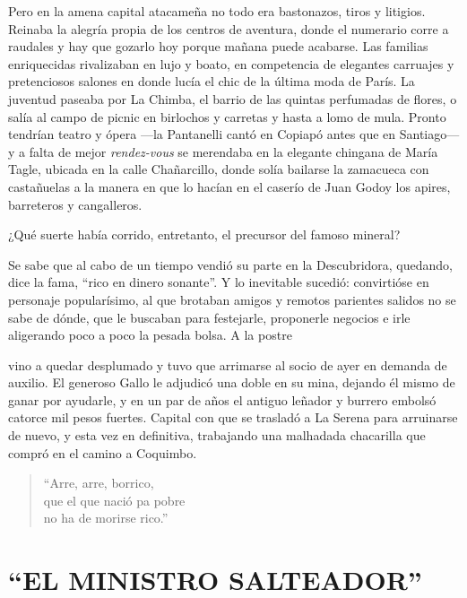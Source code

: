 \documentclass[10pt,twoside,openright]{memoir}
\begin{document}
Pero en la amena capital atacameña no todo era bastonazos, tiros y
litigios. Reinaba la alegría propia de los centros de aventura, donde el
numerario corre a raudales y hay que gozarlo hoy porque mañana puede
acabarse. Las familias enriquecidas rivalizaban en lujo y boato, en
competencia de elegantes carruajes y pretenciosos salones en donde lucía
el chic de la última moda de París. La juventud paseaba por La Chimba,
el barrio de las quintas perfumadas de flores, o salía al campo de
picnic en birlochos y carretas y hasta a lomo de mula. Pronto tendrían
teatro y ópera ---la Pantanelli cantó en Copiapó antes que en
Santiago--- y a falta de mejor \emph{rendez-vous} se merendaba en la elegante
chingana de María Tagle, ubicada en la calle Chañarcillo, donde solía
bailarse la zamacueca con castañuelas a la manera en que lo hacían en el
caserío de Juan Godoy los apires, barreteros y cangalleros.

¿Qué suerte había corrido, entretanto, el precursor del famoso mineral?

Se sabe que al cabo de un tiempo vendió su parte en la Descubridora,
quedando, dice la fama, ``rico en dinero sonante''. Y lo inevitable
sucedió: convirtióse en personaje popularísimo, al que brotaban amigos y
remotos parientes salidos no se sabe de dónde, que le buscaban para
festejarle, proponerle negocios e irle aligerando poco a poco la pesada
bolsa. A la postre

vino a quedar desplumado y tuvo que arrimarse al socio de ayer en
demanda de auxilio. El generoso Gallo le adjudicó una doble en su mina,
dejando él mismo de ganar por ayudarle, y en un par de años el antiguo
leñador y burrero embolsó catorce mil pesos fuertes. Capital con que se
trasladó a La Serena para arruinarse de nuevo, y esta vez en definitiva,
trabajando una malhadada chacarilla que compró en el camino a Coquimbo.

\begin{verse}
``Arre, arre, borrico,\\
que el que nació pa pobre\\
no ha de morirse rico.''
\end{verse}

\chapter{``EL MINISTRO SALTEADOR''}
\end{document}
